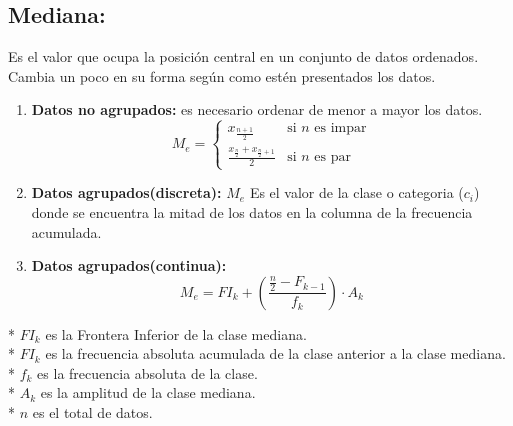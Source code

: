 \documentclass{templateNote}
\begin{document}
\subsection{Mediana:}
Es el valor que ocupa la posición central en un conjunto de datos ordenados. Cambia un
poco en su forma según como estén presentados los datos.
\begin{enumerate}
    \item \textbf{Datos no agrupados:} es necesario ordenar de menor a mayor los datos.
    \begin{equation*}
        M_e = \displaystyle \left\{ \begin{array}{ll}
            x_{\frac{n+1}{2}} & \textrm{si $n$ es impar}\\
            \frac{\displaystyle x_{\frac{n}{2}} + x_{\frac{n}{2}+1}}{2} & \textrm{si $n$ es par}
        \end{array} \right.
    \end{equation*}
    \item \textbf{Datos agrupados(discreta):}
    $M_e$ Es el valor de la clase o categoria ($c_i$) donde se encuentra la mitad de los datos en la columna de la frecuencia acumulada.
    \newpage
    \item \textbf{Datos agrupados(continua):}
    \begin{equation*}
        M_e = FI_k + \left(\frac{\displaystyle \frac{n}{2} - F_{k-1}}{f_k}\right) \cdot A_k
    \end{equation*}
\end{enumerate}
* $FI_k$ es la Frontera Inferior de la clase mediana.\\
* $FI_k$ es la frecuencia absoluta acumulada de la clase anterior a la clase mediana.\\
* $f_k$ es la frecuencia absoluta de la clase.\\
* $A_k$ es la amplitud de la clase mediana.\\
* $n$ es el total de datos.\\
\end{document}
